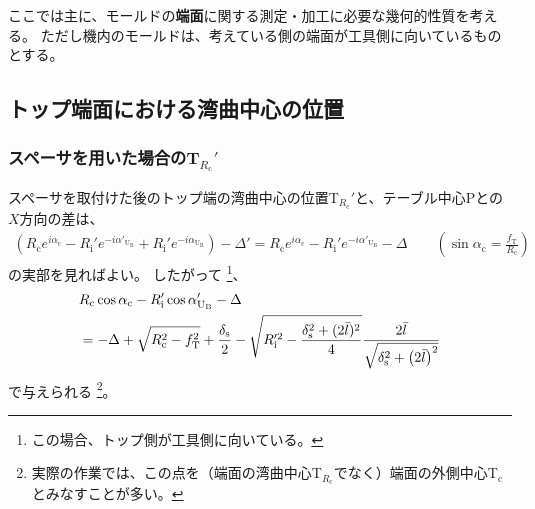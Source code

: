 

ここでは主に、モールドの\textbf{端面}に関する測定・加工に必要な幾何的性質を考える。
ただし機内のモールドは、考えている側の端面が工具側に向いているものとする。





\subsection{トップ端面における湾曲中心の位置}

\subsubsection{スペーサを用いた場合のT\texorpdfstring{$_{R_\mathrm c}'$}{Rc'}}
スペーサを取付けた後のトップ端の湾曲中心の位置T$_{R_\mathrm c}'$と、テーブル中心Pとの$X$方向の差は、
\begin{align*}
  \left(
    R_\mathrm ce^{i\alpha_\mathrm c}
    -R_\mathrm i'e^{-i\alpha'_{\mathrm U_\mathrm B}}
    +R_\mathrm i'e^{-i\alpha_{\mathrm U_\mathrm B}}
  \right)
  -\Delta'
  = R_\mathrm ce^{i\alpha_\mathrm c}-R_\mathrm i'e^{-i\alpha'_{\mathrm U_\mathrm B}}-\Delta \qquad
    \left(\sin\alpha_\mathrm c = \frac{f_\mathrm T}{R_\mathrm c}\right)
\end{align*}
の実部を見ればよい。
したがって
\footnote{この場合、トップ側が工具側に向いている。}、
\begin{align}
  \notag
  &  R_\mathrm c\cos\alpha_\mathrm c-R_\mathrm i'\cos\alpha'_{\mathrm U_\mathrm B}-\Delta\\
  &= -\Delta+\sqrt{R_\mathrm c^2-f_\mathrm T^2}+\frac{\delta_\mathrm s}2
     -\sqrt{R_\mathrm i'^2-\frac{\delta_\mathrm s^2+(2\bar l)^2}4}
      \frac{2\bar l}{\sqrt{\delta_\mathrm s^2+\left(2\bar l\right)^2}}
     \label{eq:spacerTRc}
\end{align}
で与えられる
\footnote{実際の作業では、この点を（端面の湾曲中心T$_{R_\mathrm c}\!$でなく）端面の外側中心T$_\mathrm c$とみなすことが多い。}。


